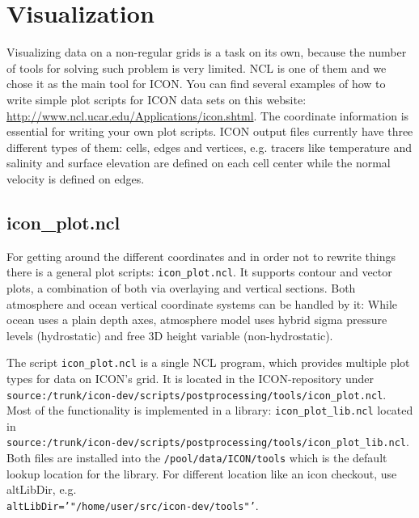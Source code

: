 \chapter{Visualization}


Visualizing data on a non-regular grids is a task on its own, because the number of tools for solving such problem is very limited. NCL is one of them and we chose it as the main tool for ICON. You can find several examples of how to write simple plot scripts for ICON data sets on this website: \href{http://www.ncl.ucar.edu/Applications/icon.shtml}{http://www.ncl.ucar.edu/Applications/icon.shtml}. The coordinate information is essential for writing your own plot scripts. ICON output files currently have three different types of them: cells, edges and vertices, e.g. tracers like temperature and salinity and surface elevation are defined on each cell center while the normal velocity is defined on edges.

\section{icon\_plot.ncl}

For getting around the different coordinates and in order not to rewrite things there is a general plot scripts: {\tt icon\_plot.ncl}. It supports contour and vector plots, a combination of both via overlaying and vertical sections. Both atmosphere and ocean vertical coordinate systems can be handled by it: While ocean uses a plain depth axes, atmosphere model uses hybrid sigma pressure levels (hydrostatic) and free 3D height variable (non-hydrostatic).

The script {\tt icon\_plot.ncl} is a single NCL program, which provides multiple plot types for data on ICON's grid. It is located in the ICON-repository under \\
{\tt source:/trunk/icon-dev/scripts/postprocessing/tools/icon\_plot.ncl}. Most of the functionality is implemented in a library: {\tt icon\_plot\_lib.ncl} located in \\
{\tt source:/trunk/icon-dev/scripts/postprocessing/tools/icon\_plot\_lib.ncl}. Both files are installed into the {\tt /pool/data/ICON/tools} which is the default lookup location for the library. For different location like an icon checkout, use altLibDir, e.g. \\
{\tt altLibDir='"/home/user/src/icon-dev/tools"'}.

